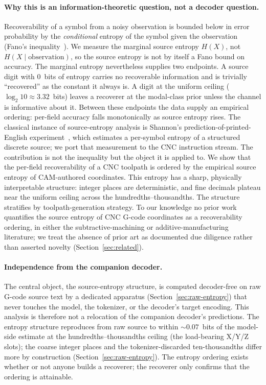 \documentclass[entropy,article,submit,moreauthors,pdftex]{Definitions/mdpi}
\begin{document}
\paragraph{Why this is an information-theoretic question, not a decoder question.} Recoverability of a symbol from a noisy observation is bounded below in error probability by the \emph{conditional} entropy of the symbol given the observation (Fano's inequality~\cite{fano1961transmission,cover_thomas}). We measure the marginal source entropy $H(X)$, not $H(X\mid\text{observation})$, so the source entropy is not by itself a Fano bound on accuracy. The marginal entropy nevertheless supplies two endpoints. A source digit with $0$~bits of entropy carries no recoverable information and is trivially ``recovered'' as the constant it always is. A digit at the uniform ceiling ($\log_2 10\approx 3.32$~bits) leaves a recoverer at the modal-class prior unless the channel is informative about it. Between these endpoints the data supply an empirical ordering: per-field accuracy falls monotonically as source entropy rises. The classical instance of source-entropy analysis is Shannon's prediction-of-printed-English experiment~\cite{shannon1951prediction}, which estimates a per-symbol entropy of a structured discrete source; we port that measurement to the CNC instruction stream. The contribution is not the inequality but the object it is applied to. We show that the per-field recoverability of a CNC toolpath is ordered by the empirical source entropy of CAM-authored coordinates. This entropy has a sharp, physically interpretable structure: integer places are deterministic, and fine decimals plateau near the uniform ceiling across the hundredths--thousandths. The structure stratifies by toolpath-generation strategy. To our knowledge no prior work quantifies the source entropy of CNC G-code coordinates as a recoverability ordering, in either the subtractive-machining or additive-manufacturing literature; we treat the absence of prior art as documented due diligence rather than asserted novelty (Section~\ref{sec:related}).

\paragraph{Independence from the companion decoder.} The central object, the source-entropy structure, is computed decoder-free on raw G-code source text by a dedicated apparatus (Section~\ref{sec:raw-entropy}) that never touches the model, the tokenizer, or the decoder's target encoding. This analysis is therefore not a relocation of the companion decoder's predictions. The entropy structure reproduces from raw source to within $\sim\!0.07$~bits of the model-side estimate at the hundredths--thousandths ceiling (the load-bearing X/Y/Z slots); the coarse integer places and the tokenizer-discarded ten-thousandths differ more by construction (Section~\ref{sec:raw-entropy}). The entropy ordering exists whether or not anyone builds a recoverer; the recoverer only confirms that the ordering is attainable.
\end{document}
